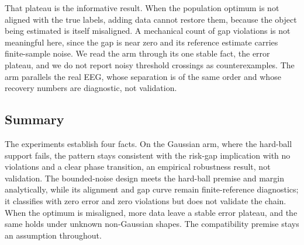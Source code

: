 That plateau is the informative result. When the population optimum is
not aligned with the true labels, adding data cannot restore them,
because the object being estimated is itself misaligned. A mechanical
count of gap violations is not meaningful here, since the gap is near
zero and its reference estimate carries finite-sample noise. We read the
arm through its one stable fact, the error plateau, and we do not report
noisy threshold crossings as counterexamples. The arm parallels the real
EEG, whose separation is of the same order and whose recovery numbers
are diagnostic, not validation.

\subsection{Summary}\label{summary-6}

The experiments establish four facts. On the Gaussian arm, where the
hard-ball support fails, the pattern stays consistent with the risk-gap
implication with no violations and a clear phase transition, an
empirical robustness result, not validation. The bounded-noise design
meets the hard-ball premise and margin analytically, while its alignment
and gap curve remain finite-reference diagnostics; it classifies with
zero error and zero violations but does not validate the chain. When the
optimum is misaligned, more data leave a stable error plateau, and the
same holds under unknown non-Gaussian shapes. The compatibility premise
stays an assumption throughout.
